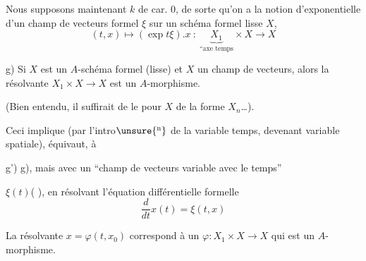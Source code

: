 Nous supposons maintenant $k$ de car. $0$, de sorte qu'on a la notion d'exponentielle d'un champ de vecteurs formel $\xi$ sur  un schéma formel lisse $X$,
\[
 (t,x)\mapsto(\exp t\xi).x\ :\ \underbrace{X_1}_{\text{``axe temps}}\times X\longrightarrow X
\]


g) Si $X$ est un $A$-schéma formel (lisse) et $X$ un champ de vecteurs, alors la résolvante $X_1\times X\longrightarrow X$ est un $A$-morphisme.

(Bien entendu, il suffirait de le  pour $X$ de la forme $X_n$\ldots).

Ceci implique  (par l'intro$\unsure{^{\mathrm n}}$ de la variable temps, devenant variable spatiale),  équivaut, à

g')  g), mais avec un ``champ de vecteurs variable avec le temps''

$\xi(t)$\quad (
), en résolvant l'équation différentielle formelle
\[
 \frac{d}{dt}x(t)=\xi(t,x)
\]

La résolvante $x=\varphi(t,x_0)$ correspond à un $\varphi:X_1\times X\longrightarrow X$ qui est un $A$-morphisme.
